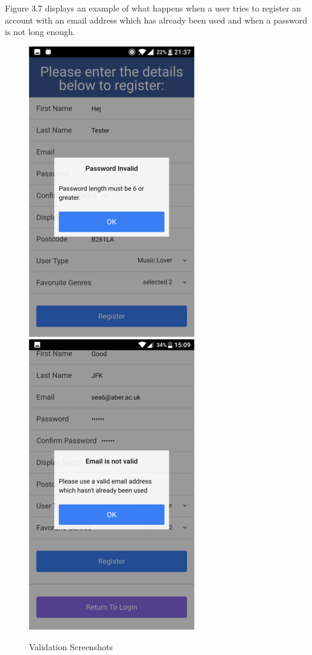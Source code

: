 Figure 3.7 displays an example of what happens when a user tries to register an account with an email address which has already been used and when a password is not long enough.
\begin{center}
\begin{figure}[H]
\includegraphics[scale=0.5]{images/sc5}
\includegraphics[scale=0.5]{images/sc6}
\caption{Validation Screenshots}
\end{figure}
\end{center}

